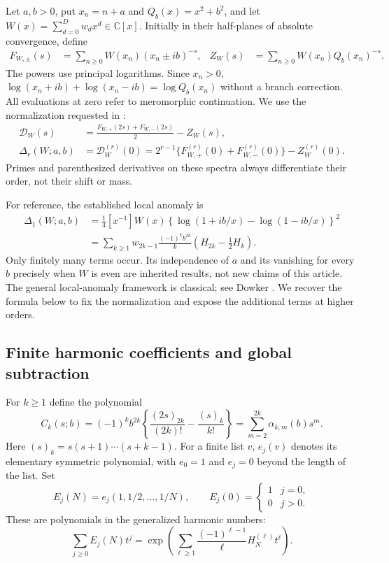 \documentclass[11pt,a4paper]{article}
\numberwithin{equation}{section}
\theoremstyle{definition}
\theoremstyle{remark}
\begin{document}
Let $a,b>0$, put $x_n=n+a$ and $Q_b(x)=x^2+b^2$, and let
$W(x)=\sum_{d=0}^{D}w_dx^d\in\mathbb C[x]$.  Initially in their
half-planes of absolute convergence, define
\begin{align}
 F_{W,\pm}(s)&=\sum_{n\ge0}W(x_n)(x_n\pm ib)^{-s},
 &Z_W(s)&=\sum_{n\ge0}W(x_n)Q_b(x_n)^{-s}.
 \label{sd:def:spectra}
\end{align}
The powers use principal logarithms.  Since $x_n>0$,
$\log(x_n+ib)+\log(x_n-ib)=\log Q_b(x_n)$ without a branch correction.
All evaluations at zero refer to meromorphic continuation.  We use the
normalization requested in \cite{QSpec}:
\begin{align}
 \mathscr D_W(s)&=\frac{F_{W,+}(2s)+F_{W,-}(2s)}2-Z_W(s),
 \label{sd:def:difference}\\
 \Delta_r(W;a,b)&=\mathscr D_W^{(r)}(0)
 =2^{r-1}\{F_{W,+}^{(r)}(0)+F_{W,-}^{(r)}(0)\}-Z_W^{(r)}(0).
 \label{sd:def:defect}
\end{align}
Primes and parenthesized derivatives on these spectra always
differentiate their order, not their shift or mass.

For reference, the established local anomaly is
\begin{align}
 \Delta_1(W;a,b)
 &=\frac14[x^{-1}]W(x)
       \left\{\log(1+ib/x)-\log(1-ib/x)\right\}^{2}
       \label{sd:eq:first-residue}\\
 &=\sum_{k\ge1}w_{2k-1}\frac{(-1)^kb^{2k}}{k}
       \left(H_{2k}-\frac12H_k\right).
       \label{sd:eq:first-harmonic}
\end{align}
Only finitely many terms occur.  Its independence of $a$ and its
vanishing for every $b$ precisely when $W$ is even are inherited
results, not new claims of this article.  The general local-anomaly
framework is classical; see Dowker \cite{Dowker}.  We recover the formula
below to fix the normalization and expose the additional terms at
higher orders.

\subsection{Finite harmonic coefficients and global subtraction}

For $k\ge1$ define the polynomial
\begin{equation}\label{sd:eq:Ck}
 C_k(s;b)=(-1)^kb^{2k}
 \left\{\frac{(2s)_{2k}}{(2k)!}-\frac{(s)_k}{k!}\right\}
 =\sum_{m=2}^{2k}\alpha_{k,m}(b)s^m.
\end{equation}
Here $(s)_k=s(s+1)\cdots(s+k-1)$.  For a finite list $v$,
$e_j(v)$ denotes its elementary symmetric polynomial, with $e_0=1$
and $e_j=0$ beyond the length of the list.  Set
\begin{equation}\label{sd:eq:elementary}
 E_j(N)=e_j(1,1/2,\ldots,1/N),\qquad E_j(0)=\begin{cases}1&j=0,\\0&j>0.\end{cases}
\end{equation}
These are polynomials in the generalized harmonic numbers:
\[
 \sum_{j\ge0}E_j(N)t^j
 =\exp\left(\sum_{\ell\ge1}
       \frac{(-1)^{\ell-1}}{\ell}H_N^{(\ell)}t^\ell\right).
\]
\end{document}
